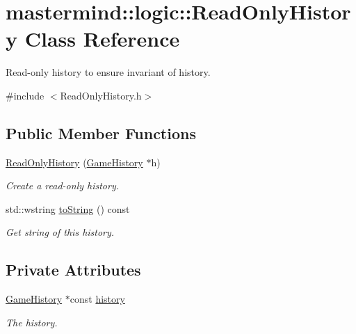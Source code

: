 \hypertarget{classmastermind_1_1logic_1_1_read_only_history}{}\section{mastermind\+:\+:logic\+:\+:Read\+Only\+History Class Reference}
\label{classmastermind_1_1logic_1_1_read_only_history}


Read-\/only history to ensure invariant of history.  




{\ttfamily \#include $<$Read\+Only\+History.\+h$>$}

\subsection*{Public Member Functions}
\begin{DoxyCompactItemize}
\item 
\hyperlink{classmastermind_1_1logic_1_1_read_only_history_a47c2ea23a91610532e19d1097d98492e}{Read\+Only\+History} (\hyperlink{classmastermind_1_1logic_1_1_game_history}{Game\+History} $\ast$h)
\begin{DoxyCompactList}\small\item\em Create a read-\/only history. \end{DoxyCompactList}\item 
std\+::wstring \hyperlink{classmastermind_1_1logic_1_1_read_only_history_a87011de9b87d3a754a64f0292ceaf10f}{to\+String} () const
\begin{DoxyCompactList}\small\item\em Get string of this history. \end{DoxyCompactList}\end{DoxyCompactItemize}
\subsection*{Private Attributes}
\begin{DoxyCompactItemize}
\item 
\hyperlink{classmastermind_1_1logic_1_1_game_history}{Game\+History} $\ast$const \hyperlink{classmastermind_1_1logic_1_1_read_only_history_a95e89bc90b14b6b6a6ddcc48268344ce}{history}
\begin{DoxyCompactList}\small\item\em The history. \end{DoxyCompactList}\end{DoxyCompactItemize}



